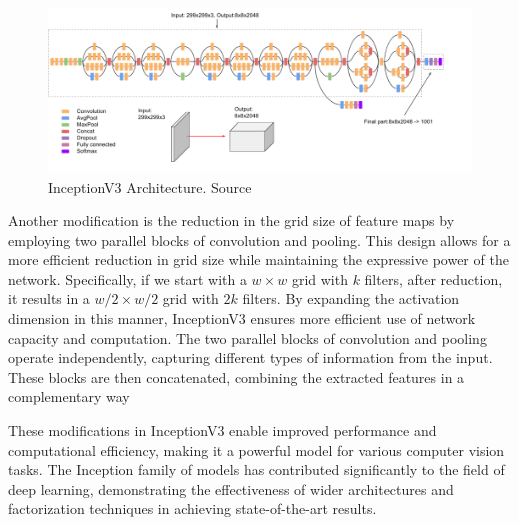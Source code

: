 \begin{figure}
\centering
\includegraphics[width=13cm]{images/blackboxes/inceptionv3.png}
\caption{InceptionV3 Architecture. Source \cite{inceptionv3}}
\end{figure}

Another modification is the reduction in the grid size of feature maps by employing two parallel blocks of convolution and pooling. This design allows for a more efficient reduction in grid size while maintaining the expressive power of the network. Specifically, if we start with a $w\times w$ grid with $k$ filters, after reduction, it results in a $w/2\times w/2$ grid with $2k$ filters. By expanding the activation dimension in this manner, InceptionV3 ensures more efficient use of network capacity and computation. The two parallel blocks of convolution and pooling operate independently, capturing different types of information from the input. These blocks are then concatenated, combining the extracted features in a complementary way

These modifications in InceptionV3 enable improved performance and computational efficiency, making it a powerful model for various computer vision tasks. The Inception family of models has contributed significantly to the field of deep learning, demonstrating the effectiveness of wider architectures and factorization techniques in achieving state-of-the-art results.